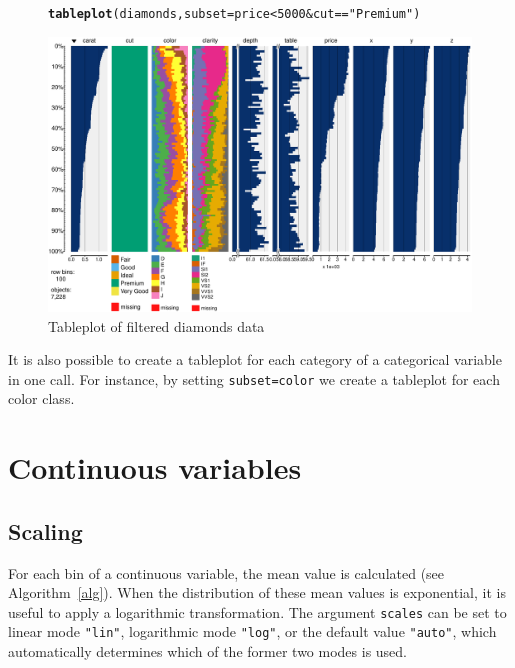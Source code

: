 \documentclass[11pt, fleqn, a4paper]{article}\usepackage{graphicx, color}
\makeatletter
\def\maxwidth{ %
  \ifdim\Gin@nat@width>\linewidth
    \linewidth
  \else
    \Gin@nat@width
  \fi
}
\newcommand{\hlfunctioncall}[1]{\textcolor[rgb]{0.501960784313725,0,0.329411764705882}{\textbf{#1}}}%
\newcommand{\hlstring}[1]{\textcolor[rgb]{0.6,0.6,1}{#1}}%
\newenvironment{kframe}{%
 \def\at@end@of@kframe{}%
 \ifinner\ifhmode%
  \def\at@end@of@kframe{\end{minipage}}%
  \begin{minipage}{\columnwidth}%
 \fi\fi%
 \def\FrameCommand##1{\hskip\@totalleftmargin \hskip-\fboxsep
 \colorbox{shadecolor}{##1}\hskip-\fboxsep
     \hskip-\linewidth \hskip-\@totalleftmargin \hskip\columnwidth}%
 \MakeFramed {\advance\hsize-\width
   \@totalleftmargin\z@ \linewidth\hsize
   \@setminipage}}%
 {\par\unskip\endMakeFramed%
 \at@end@of@kframe}
\newenvironment{knitrout}{}{} %
\makeatother
\begin{document}
\begin{figure}[!htp]
\begin{knitrout}
\color{fgcolor}\begin{kframe}
\begin{alltt}
\hlfunctioncall{tableplot}(diamonds, subset = price < 5000 & cut == \hlstring{"Premium"})
\end{alltt}
\end{kframe}
\includegraphics[width=\maxwidth]{figure/chunk5} 

\end{knitrout}

\caption{Tableplot of filtered diamonds data}
\label{fig:tp4}
\end{figure}

It is also possible to create a tableplot for each category of a categorical variable in one call. For instance, by setting {\tt subset=color} we create a tableplot for each color class.

\clearpage

\section{Continuous variables}

\subsection{Scaling}
For each bin of a continuous variable, the mean value is calculated (see Algorithm~\ref{alg}).
When the distribution of these mean values is exponential, it is useful to apply a logarithmic transformation. The argument {\tt scales} can be set to linear mode {\tt "lin"}, logarithmic mode {\tt "log"}, or the default value {\tt "auto"}, which automatically determines which of the former two modes is used.
\end{document}
